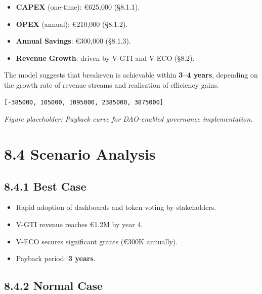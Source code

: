 \documentclass[
  english,
  12pt,
  oneside,
  open=any]{scrbook}
\providecommand{\tightlist}{%
  \setlength{\itemsep}{0pt}\setlength{\parskip}{0pt}}\usepackage{longtable,booktabs,array}
\begin{document}
\begin{itemize}
\tightlist
\item
  \textbf{CAPEX} (one-time): €625,000 (§8.1.1).\\
\item
  \textbf{OPEX} (annual): €210,000 (§8.1.2).\\
\item
  \textbf{Annual Savings}: €300,000 (§8.1.3).\\
\item
  \textbf{Revenue Growth}: driven by V-GTI and V-ECO (§8.2).
\end{itemize}

The model suggests that breakeven is achievable within \textbf{3--4
years}, depending on the growth rate of revenue streams and realisation
of efficiency gains.

\begin{verbatim}
[-385000, 105000, 1095000, 2385000, 3875000]
\end{verbatim}

\emph{Figure placeholder: Payback curve for DAO-enabled governance
implementation.}

\section{8.4 Scenario Analysis}\label{scenario-analysis}

\subsection{8.4.1 Best Case}\label{sec-best}

\begin{itemize}
\tightlist
\item
  Rapid adoption of dashboards and token voting by stakeholders.\\
\item
  V-GTI revenue reaches €1.2M by year 4.\\
\item
  V-ECO secures significant grants (€300K annually).\\
\item
  Payback period: \textbf{3 years}.
\end{itemize}

\subsection{8.4.2 Normal Case}\label{sec-normal}
\end{document}
